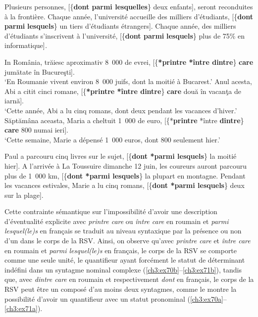 \ea \label{ch3:ex67}
\ea
Plusieurs personnes, [\{\textbf{dont {\textbar} parmi lesquelles}\} deux enfants], seront reconduites à la frontière.
\ex
Chaque année, l’université accueille des milliers d’étudiants, [\{\textbf{dont {\textbar} parmi} \textbf{lesquels}\} un tiers d’étudiants étrangers].
\ex 
Chaque année, des milliers d’étudiants s’inscrivent à l’université, [\{\textbf{dont {\textbar} parmi} \textbf{lesquels}\} plus de 75\% en informatique]\emph{\textup{.} }
\z 
\z 

\ea \label{ch3:ex68}
\ea
In România, trăiesc aproximativ 8~000 de evrei, [\{\textbf{*printre {\textbar} *între {\textbar} dintre}\}\textbf{ care} jumătate în Bucureşti].  \\
\glt ‘En Roumanie vivent environ 8~000 juifs, dont la moitié à Bucarest.’
\ex 
Anul acesta, Abi a citit cinci romane, [\{\textbf{*printre {\textbar} *între {\textbar} dintre}\} \textbf{care} două în vacanţa de iarnă]. \\
\glt ‘Cette année, Abi a lu cinq romans, dont deux pendant les vacances d’hiver.’
\ex 
Săptămâna aceasta, Maria a cheltuit 1~000 de euro, [\{*\textbf{printre} {\textbar} *între {\textbar} \textbf{dintre}\} \textbf{care} 800 numai ieri].\\
\glt ‘Cette semaine, Marie a dépensé 1~000 euros, dont 800 seulement hier.’
\z 
\z 

\ea \label{ch3:ex69} 
\ea 
Paul a parcouru cinq livres sur le sujet, [\{\textbf{dont {\textbar} *parmi lesquels}\} la moitié hier]. 
\ex
A l’arrivée à La Toussuire dimanche 12 juin, les coureurs auront parcouru plus de 1~000 km, [\{\textbf{dont {\textbar} *parmi lesquels}\} la plupart en montagne.
\ex 
Pendant les vacances estivales, Marie a lu cinq romans, [\{\textbf{dont {\textbar} *parmi lesquels}\} deux sur la plage].
\z 
\z

Cette contrainte sémantique sur l’impossibilité d’avoir une description d’éven\-tualité explicite avec \textit{printre care} ou \textit{între care} en roumain et \textit{parmi lesquel(le)s} en français se traduit au niveau syntaxique par la présence ou non d’un  dans le corps de la RSV. Ainsi, on observe qu’avec \textit{printre care} et \textit{între care} en roumain et \textit{parmi lesquel(le)s} en français, le corps de la RSV se comporte comme une seule unité, le quantifieur ayant forcément le statut de déterminant indéfini dans un syntagme nominal complexe (\ref{ch3:ex70b}--\ref{ch3:ex71b}), tandis que, avec \textit{dintre care} en roumain et respectivement \textit{dont} en français, le corps de la RSV peut être un  composé d’au moins deux syntagmes, comme le montre la possibilité d’avoir un quantifieur avec un statut pronominal (\ref{ch3:ex70a}--\ref{ch3:ex71a}).     

